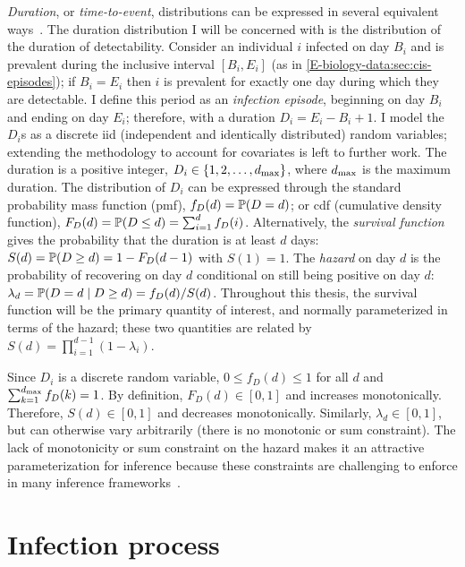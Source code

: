 \documentclass[thesis.tex]{subfiles}
\begin{document}
\emph{Duration}, or \emph{time-to-event}, distributions can be expressed in several equivalent ways~\autocite[17]{sunStatisticala}.
The duration distribution I will be concerned with is the distribution of the duration of detectability.
Consider an individual $i$ infected on day $B_i$ and is prevalent during the inclusive interval $[B_i, E_i]$ (as in \cref{E-biology-data:sec:cis-episodes}); if $B_i = E_i$ then $i$ is prevalent for exactly one day during which they are detectable.
I define this period as an \emph{infection episode}, beginning on day $B_i$ and ending on day $E_i$; therefore, with a duration $D_i = E_i - B_i + 1$.
I model the $D_i$s as a discrete iid (independent and identically distributed) random variables; extending the methodology to account for covariates is left to further work.
The duration is a positive integer, \ie $D_i \in \{1, 2, \dots, d_\text{max} \}$, where $d_\text{max}$ is the maximum duration.
The distribution of $D_i$ can be expressed through the standard probability mass function (pmf), $f_{D}(d) = \operatorname{\mathbb{P}}(D = d)$; or cdf (cumulative density function), $F_{D}(d) = \operatorname{\mathbb{P}}(D \leq d) = \sum_{i=1}^d f_{D}(i)$.
Alternatively, the \emph{survival function} gives the probability that the duration is at least $d$ days: $S(d) = \operatorname{\mathbb{P}}(D \geq d) = 1 - F_{D}(d - 1)$ with $S(1) = 1$.
The \emph{hazard} on day $d$ is the probability of recovering on day $d$ conditional on still being positive on day $d$: $\lambda_{d} = \operatorname{\mathbb{P}}(D = d \mid D \geq d) = f_{D}(d) / S(d)$.
Throughout this thesis, the survival function will be the primary quantity of interest, and normally parameterized in terms of the hazard; these two quantities are related by $S(d) = \prod_{i=1}^{d-1} (1 - \lambda_{i})$.

Since $D_i$ is a discrete random variable, $0 \leq f_D(d) \leq 1$ for all $d$ and $\sum_{k=1}^{d_\text{max}} f_D(k) = 1$.
By definition, $F_D(d) \in [0, 1]$ and increases monotonically.
Therefore, $S(d) \in [0, 1]$ and decreases monotonically.
Similarly, $\lambda_{d} \in [0,1]$, but can otherwise vary arbitrarily (\ie there is no monotonic or sum constraint).
The lack of monotonicity or sum constraint on the hazard makes it an attractive parameterization for inference because these constraints are challenging to enforce in many inference frameworks~\autocite{heBayesian}.

\section{Infection process} \label{inc-prev:sec:infection-process}
\end{document}
